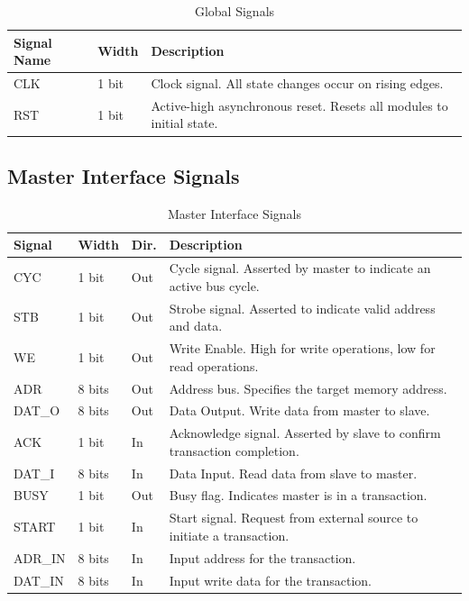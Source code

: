 \documentclass[12pt,a4paper]{article}
\begin{document}
\begin{table}[H]
    \centering
    \begin{tabular}{|p{2cm}|p{1.5cm}|p{5cm}|}
        \hline
        \textbf{Signal Name} & \textbf{Width} & \textbf{Description} \\
        \hline
        CLK & 1 bit & Clock signal. All state changes occur on rising edges. \\
        RST & 1 bit & Active-high asynchronous reset. Resets all modules to initial state. \\
        \hline
    \end{tabular}
    \caption{Global Signals}
\end{table}

\subsection{Master Interface Signals}

\begin{table}[H]
    \centering
    \begin{tabular}{|p{2cm}|p{1.5cm}|p{1cm}|p{4cm}|}
        \hline
        \textbf{Signal} & \textbf{Width} & \textbf{Dir.} & \textbf{Description} \\
        \hline
        CYC & 1 bit & Out & Cycle signal. Asserted by master to indicate an active bus cycle. \\
        STB & 1 bit & Out & Strobe signal. Asserted to indicate valid address and data. \\
        WE & 1 bit & Out & Write Enable. High for write operations, low for read operations. \\
        ADR & 8 bits & Out & Address bus. Specifies the target memory address. \\
        DAT\_O & 8 bits & Out & Data Output. Write data from master to slave. \\
        ACK & 1 bit & In & Acknowledge signal. Asserted by slave to confirm transaction completion. \\
        DAT\_I & 8 bits & In & Data Input. Read data from slave to master. \\
        BUSY & 1 bit & Out & Busy flag. Indicates master is in a transaction. \\
        START & 1 bit & In & Start signal. Request from external source to initiate a transaction. \\
        ADR\_IN & 8 bits & In & Input address for the transaction. \\
        DAT\_IN & 8 bits & In & Input write data for the transaction. \\
        \hline
    \end{tabular}
    \caption{Master Interface Signals}
\end{table}
\end{document}
